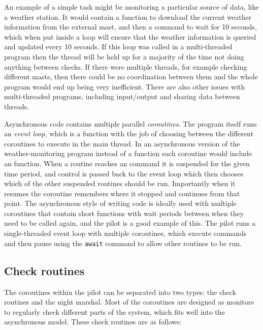 \begin{colsection}
\begin{colsection}
An example of a simple task might be monitoring a particular source of data, like a weather station. It would contain a function to download the current weather information from the external mast, and then a  command to wait for 10 seconds, which when put inside a loop will ensure that the weather information is queried and updated every 10 seconds. If this loop was called in a multi-threaded program then the thread will be held up for a majority of the time not doing anything between checks. If there were multiple threads, for example checking different masts, then there could be no coordination between them and the whole program would end up being very inefficient. There are also other issues with multi-threaded programs, including input/output and sharing data between threads.

Asynchronous code contains multiple parallel \textit{coroutines}. The program itself runs an \textit{event loop}, which is a function with the job of choosing between the different coroutines to execute in the main thread. In an asynchronous version of the weather-monitoring program instead of a  function each coroutine would include an  function. When a routine reaches an  command it is suspended for the given time period, and control is passed back to the event loop which then chooses which of the other suspended routines should be run. Importantly when it resumes the coroutine remembers where it stopped and continues from that point. The asynchronous style of writing code is ideally used with multiple coroutines that contain short functions with wait periods between when they need to be called again, and the pilot is a good example of this. The pilot runs a single-threaded event loop with multiple coroutines, which execute commands and then pause using the \texttt{await} command to allow other routines to be run.

\end{colsection}

\subsection{Check routines}
\label{sec:checks}
\begin{colsection}

The coroutines within the pilot can be separated into two types: the check routines and the night marshal. Most of the coroutines are designed as monitors to regularly check different parts of the system, which fits well into the asynchronous model. These check routines are as follows:


\end{colsection}
\end{colsection}
